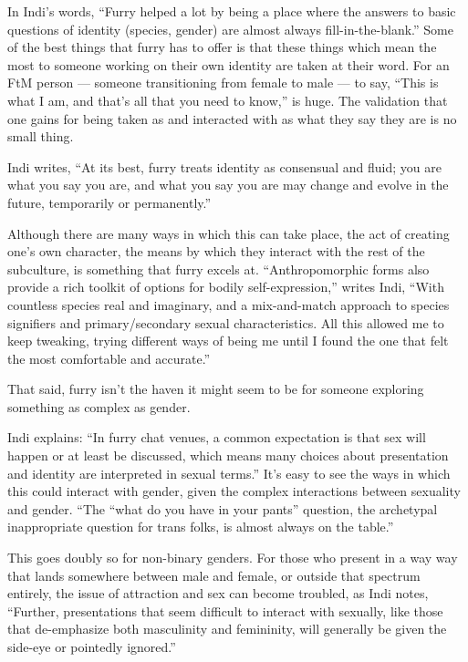 In Indi's words, ``Furry helped a lot by being a place where the answers to basic questions of identity (species, gender) are almost always fill-in-the-blank.''  Some of the best things that furry has to offer is that these things which mean the most to someone working on their own identity are taken at their word.  For an FtM person --- someone transitioning from female to male --- to say, ``This is what I am, and that's all that you need to know,'' is huge.  The validation that one gains for being taken as and interacted with as what they say they are is no small thing.

Indi writes, ``At its best, furry treats identity as consensual and fluid; you are what you say you are, and what you say you are may change and evolve in the future, temporarily or permanently.''

Although there are many ways in which this can take place, the act of creating one's own character, the means by which they interact with the rest of the subculture, is something that furry excels at.  ``Anthropomorphic forms also provide a rich toolkit of options for bodily self-expression,'' writes Indi, ``With countless species real and imaginary, and a mix-and-match approach to species signifiers and primary/secondary sexual characteristics. All this allowed me to keep tweaking, trying different ways of being me until I found the one that felt the most comfortable and accurate.''

That said, furry isn't the haven it might seem to be for someone exploring something as complex as gender.

Indi explains: ``In furry chat venues, a common expectation is that sex will happen or at least be discussed, which means many choices about presentation and identity are interpreted in sexual terms.'' It's easy to see the ways in which this could interact with gender, given the complex interactions between sexuality and gender. ``The ``what do you have in your pants'' question, the archetypal inappropriate question for trans folks, is almost always on the table.''

This goes doubly so for non-binary genders.  For those who present in a way way that lands somewhere between male and female, or outside that spectrum entirely, the issue of attraction and sex can become troubled, as Indi notes, ``Further, presentations that seem difficult to interact with sexually, like those that de-emphasize both masculinity and femininity, will generally be given the side-eye or pointedly ignored.''

